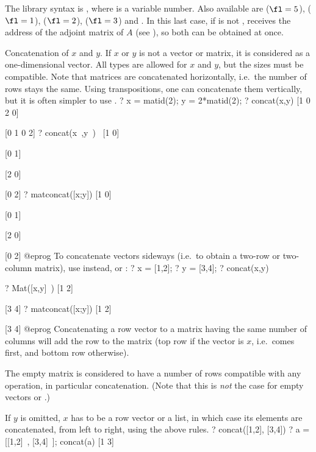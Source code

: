 The library syntax is , where  is a variable number.
Also available are
 ($\fl=5$),
 ($\fl=1$),
 ($\fl=2$),
 ($\fl=3$) and
. In this
last case, if  is not ,  receives the address of
the adjoint matrix of $A$ (see ), so both can be obtained at
once.

\label{se:concat}
Concatenation of $x$ and $y$. If $x$ or $y$ is
not a vector or matrix, it is considered as a one-dimensional vector. All
types are allowed for $x$ and $y$, but the sizes must be compatible. Note
that matrices are concatenated horizontally, i.e.~the number of rows stays
the same. Using transpositions, one can concatenate them vertically,
but it is often simpler to use .
\bprog
? x = matid(2); y = 2*matid(2);
? concat(x,y)
[1 0 2 0]

[0 1 0 2]
? concat(x~,y~)~
[1 0]

[0 1]

[2 0]

[0 2]
? matconcat([x;y])
[1 0]

[0 1]

[2 0]

[0 2]
@eprog\noindent
To concatenate vectors sideways (i.e.~to obtain a two-row or two-column
matrix), use  instead, or :
\bprog
? x = [1,2];
? y = [3,4];
? concat(x,y)

? Mat([x,y]~)
[1 2]

[3 4]
? matconcat([x;y])
[1 2]

[3 4]
@eprog
Concatenating a row vector to a matrix having the same number of columns will
add the row to the matrix (top row if the vector is $x$, i.e.~comes first, and
bottom row otherwise).

The empty matrix \kbd{[;]} is considered to have a number of rows compatible
with any operation, in particular concatenation. (Note that this is
\emph{not} the case for empty vectors \kbd{[~]} or \kbd{[~]\til}.)

If $y$ is omitted, $x$ has to be a row vector or a list, in which case its
elements are concatenated, from left to right, using the above rules.
\bprog
? concat([1,2], [3,4])
? a = [[1,2]~, [3,4]~]; concat(a)
[1 3]


